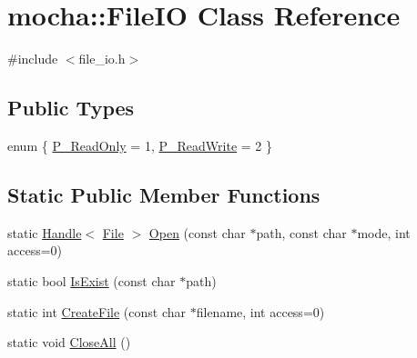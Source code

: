 \hypertarget{classmocha_1_1_file_i_o}{
\section{mocha::FileIO Class Reference}
\label{classmocha_1_1_file_i_o}
}


{\ttfamily \#include $<$file\_\-io.h$>$}

\subsection*{Public Types}
\begin{DoxyCompactItemize}
\item 
enum \{ \hyperlink{classmocha_1_1_file_i_o_a33f3257114b98f0bcfd1b453502322ccacde5ebe2d91c18522bb0f9258c35224f}{P\_\-ReadOnly} =  1, 
\hyperlink{classmocha_1_1_file_i_o_a33f3257114b98f0bcfd1b453502322cca18755b1d05959c7f280a15ab63a8396a}{P\_\-ReadWrite} =  2
 \}
\end{DoxyCompactItemize}
\subsection*{Static Public Member Functions}
\begin{DoxyCompactItemize}
\item 
static \hyperlink{classmocha_1_1_handle}{Handle}$<$ \hyperlink{classmocha_1_1_file}{File} $>$ \hyperlink{classmocha_1_1_file_i_o_a3dbfdb307776b6f8dd0dd2c6e5eed0ff}{Open} (const char $\ast$path, const char $\ast$mode, int access=0)
\item 
static bool \hyperlink{classmocha_1_1_file_i_o_af6d4b2eca0924785626797e8b2e799d6}{IsExist} (const char $\ast$path)
\item 
static int \hyperlink{classmocha_1_1_file_i_o_a91a7a2d0bc5a95eac39d012675f77be5}{CreateFile} (const char $\ast$filename, int access=0)
\item 
static void \hyperlink{classmocha_1_1_file_i_o_a55384acfc71fae22fb3f453c6775ba59}{CloseAll} ()
\end{DoxyCompactItemize}
